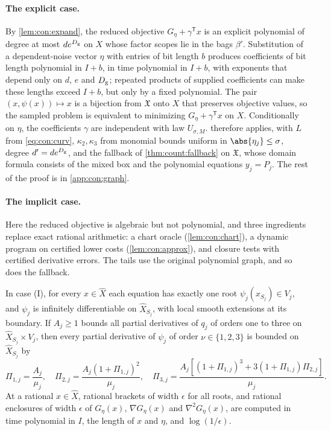 \paragraph{The explicit case.}
By \cref{lem:con:expand}, the reduced objective $G_\eta+\gamma^{\mathsf T}x$
is an explicit polynomial of degree at most $de^{D_{\rm g}}$ on $X$ whose
factor scopes lie in the bags $\beta'$. Substitution of a dependent-noise
vector $\eta$ with entries of bit length $b$ produces coefficients of bit
length polynomial in $I+b$, in time polynomial in $I+b$, with exponents that
depend only on $d$, $e$ and $D_{\rm g}$; repeated products of supplied
coefficients can make these lengths exceed $I+b$, but only by a fixed
polynomial. The pair $(x,\psi(x))\mapsto x$ is a bijection from
$\mathfrak X$ onto $X$ that preserves objective values, so the sampled problem
is equivalent to minimizing $G_\eta+\gamma^{\mathsf T}x$ on $X$. Conditionally
on $\eta$, the coefficients $\gamma$ are independent with law $U_{\sigma,M}$.
 therefore applies, with $L$ from
\eqref{eq:con:curv}, $\kappa_2,\kappa_3$ from monomial bounds uniform in
$\abs{\eta_j}\le\sigma$, degree $d'=de^{D_{\rm g}}$, and the fallback of
\cref{thm:count:fallback} on $\mathfrak X$, whose domain formula consists of the
mixed box and the polynomial equations $y_j=P_j$. The rest of the proof is in
\cref{app:con:graph}.

\paragraph{The implicit case.}
Here the reduced objective is algebraic but not polynomial, and three
ingredients replace exact rational arithmetic: a chart oracle
(\cref{lem:con:chart}), a dynamic program on certified lower costs
(\cref{lem:con:approx}), and closure tests with certified derivative errors.
The tails use the original polynomial graph, and so does the fallback.

\begin{lemma}[Chart]\label{lem:con:chart}
In case (I), for every $x\in\widehat X$ each equation has exactly one root
$\psi_j(x_{S_j})\in V_j$, and $\psi_j$ is infinitely differentiable on
$\widehat X_{S_j}$, with local smooth extensions at its boundary. If
$A_j\ge1$ bounds all partial derivatives of $q_j$ of orders one to three on
$\widehat X_{S_j}\times V_j$, then every partial derivative of $\psi_j$ of
order $\nu\in\{1,2,3\}$ is bounded on $\widehat X_{S_j}$ by
\[
 \Pi_{1,j}=\frac{A_j}{\mu_j},\quad
 \Pi_{2,j}=\frac{A_j(1+\Pi_{1,j})^2}{\mu_j},\quad
 \Pi_{3,j}=\frac{A_j[(1+\Pi_{1,j})^3+3(1+\Pi_{1,j})\Pi_{2,j}]}{\mu_j}.
\]
At a rational $x\in\widehat X$, rational brackets of width $\epsilon$ for all
roots, and rational enclosures of width $\epsilon$ of $G_\eta(x)$,
$\nabla G_\eta(x)$ and $\nabla^2G_\eta(x)$, are computed in time polynomial in
$I$, the length of $x$ and $\eta$, and $\log(1/\epsilon)$.
\end{lemma}

